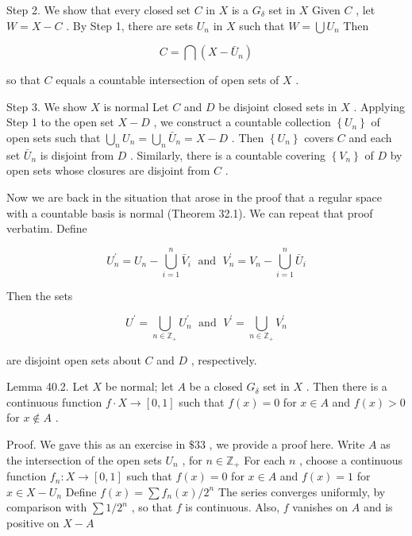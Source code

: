 Step 2. We show that every closed set \(C\) in \(X\) is a \({G}_{\delta }\) set in \(X\) Given \(C\) , let \(W = X - C\) . By Step 1, there are sets \({U}_{n}\) in \(X\) such that \(W = \bigcup {U}_{n}\) Then

\[
C = \bigcap \left( {X - {\bar{U}}_{n}}\right)
\]

so that \(C\) equals a countable intersection of open sets of \(X\) .

Step 3. We show \(X\) is normal Let \(C\) and \(D\) be disjoint closed sets in \(X\) . Applying Step 1 to the open set \(X - D\) , we construct a countable collection \(\left\{  {U}_{n}\right\}\) of open sets such that \(\mathop{\bigcup }\limits_{n}{U}_{n} = \mathop{\bigcup }\limits_{n}{\bar{U}}_{n} = X - D\) . Then \(\left\{  {U}_{n}\right\}\) covers \(C\) and each set \({\bar{U}}_{n}\) is disjoint from \(D\) . Similarly, there is a countable covering \(\left\{  {V}_{n}\right\}\) of \(D\) by open sets whose closures are disjoint from \(C\) .

Now we are back in the situation that arose in the proof that a regular space with a countable basis is normal (Theorem 32.1). We can repeat that proof verbatim. Define

\[
{U}_{n}^{\prime } = {U}_{n} - \mathop{\bigcup }\limits_{{i = 1}}^{n}{\bar{V}}_{i}\;\text{ and }\;{V}_{n}^{\prime } = {V}_{n} - \mathop{\bigcup }\limits_{{i = 1}}^{n}{\bar{U}}_{i}
\]

Then the sets

\[
{U}^{\prime } = \mathop{\bigcup }\limits_{{n \in  {\mathbb{Z}}_{ + }}}{U}_{n}^{\prime }\;\text{ and }\;{V}^{\prime } = \mathop{\bigcup }\limits_{{n \in  {\mathbb{Z}}_{ + }}}{V}_{n}^{\prime }
\]

are disjoint open sets about \(C\) and \(D\) , respectively.

Lemma 40.2. Let \(X\) be normal; let \(A\) be a closed \({G}_{\delta }\) set in \(X\) . Then there is a continuous function \(f \cdot  X \rightarrow  \left\lbrack  {0,1}\right\rbrack\) such that \(f\left( x\right)  = 0\) for \(x \in  A\) and \(f\left( x\right)  > 0\) for \(x \notin  A\) .

Proof. We gave this as an exercise in \(\$ {33}\) , we provide a proof here. Write \(A\) as the intersection of the open sets \({U}_{n}\) , for \(n \in  {\mathbb{Z}}_{ + }\) For each \(n\) , choose a continuous function \({f}_{n} : X \rightarrow  \left\lbrack  {0,1}\right\rbrack\) such that \(f\left( x\right)  = 0\) for \(x \in  A\) and \(f\left( x\right)  = 1\) for \(x \in  X - {U}_{n}\) Define \(f\left( x\right)  = \sum {f}_{n}\left( x\right) /{2}^{n}\) The series converges uniformly, by comparison with \(\sum 1/{2}^{n}\) , so that \(f\) is continuous. Also, \(f\) vanishes on \(A\) and is positive on \(X - A\)


